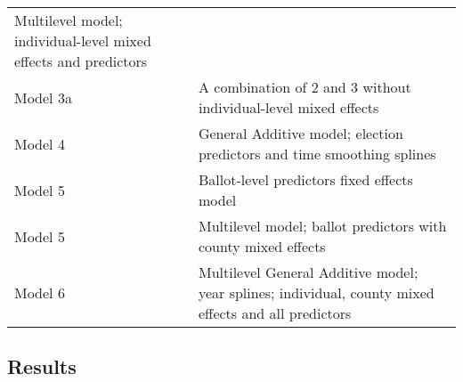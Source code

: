 \documentclass[12pt,twoside]{reedthesis}
\begin{document}
\begin{longtable}[]{@{}ll@{}}
\begin{minipage}[t]{0.80\columnwidth}
  Multilevel model; individual-level mixed effects and predictors\strut
  \end{minipage}\tabularnewline
  \begin{minipage}[t]{0.15\columnwidth}\raggedright\strut
  Model 3a\strut
  \end{minipage} & \begin{minipage}[t]{0.80\columnwidth}\raggedright\strut
  A combination of 2 and 3 without individual-level mixed effects\strut
  \end{minipage}\tabularnewline
  \begin{minipage}[t]{0.15\columnwidth}\raggedright\strut
  Model 4\strut
  \end{minipage} & \begin{minipage}[t]{0.80\columnwidth}\raggedright\strut
  General Additive model; election predictors and time smoothing
  splines\strut
  \end{minipage}\tabularnewline
  \begin{minipage}[t]{0.15\columnwidth}\raggedright\strut
  Model 5\strut
  \end{minipage} & \begin{minipage}[t]{0.80\columnwidth}\raggedright\strut
  Ballot-level predictors fixed effects model\strut
  \end{minipage}\tabularnewline
  \begin{minipage}[t]{0.15\columnwidth}\raggedright\strut
  Model 5\strut
  \end{minipage} & \begin{minipage}[t]{0.80\columnwidth}\raggedright\strut
  Multilevel model; ballot predictors with county mixed effects\strut
  \end{minipage}\tabularnewline
  \begin{minipage}[t]{0.15\columnwidth}\raggedright\strut
  Model 6\strut
  \end{minipage} & \begin{minipage}[t]{0.80\columnwidth}\raggedright\strut
  Multilevel General Additive model; year splines; individual, county
  mixed effects and all predictors\strut
  \end{minipage}\tabularnewline
  \bottomrule
  \end{longtable}
  
  \subsection{Results}\label{results-1}
  
\end{document}
